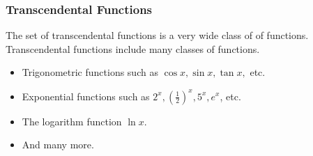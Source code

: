\begin{frame}
\frametitle{Transcendental Functions}
The set of transcendental functions is a very wide class of of functions. Transcendental functions include many classes of functions.
\begin{itemize}
\item<2->  Trigonometric functions such as $\cos x, \sin x, \tan x,$ etc.
\item<3->  Exponential functions such as $2^x, \left( \frac{1}{2}\right)^x, 5^x, e^x$, etc.
\item<4->  The logarithm function $\ln x$.
\item<5->  And many more.
\end{itemize}
\end{frame}

